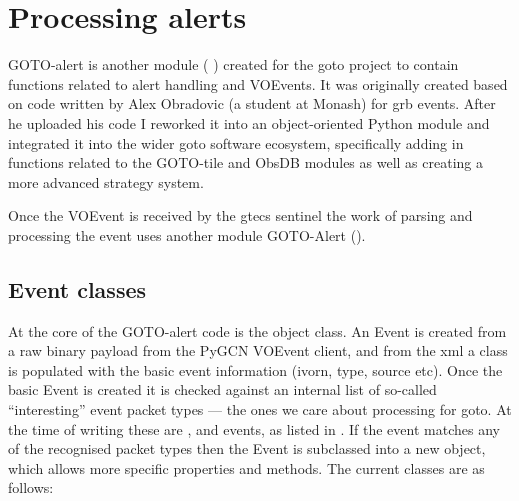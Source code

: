 \section{Processing alerts}
\label{sec:gotoalert}
\begin{colsection}


\begin{colsection}


GOTO-alert is another  module ( ) created for the \gls{goto} project to contain functions related to alert handling and VOEvents. It was originally created based on code written by Alex Obradovic (a student at Monash) for \gls{grb} events. After he uploaded his code I reworked it into an object-oriented Python module and integrated it into the wider \gls{goto} software ecosystem, specifically adding in functions related to the GOTO-tile and ObsDB modules as well as creating a more advanced strategy system.

Once the VOEvent is received by the \gls{gtecs} sentinel the work of parsing and processing the event uses another  module GOTO-Alert ().

\end{colsection}


\subsection{Event classes}
\label{sec:event_classes}
\begin{colsection}

At the core of the GOTO-alert code is the  object class. An Event is created from a raw binary payload from the PyGCN VOEvent client, and from the \gls{xml} a  class is populated with the basic event information (\gls{ivorn}, type, source etc). Once the basic Event is created it is checked against an internal list of so-called ``interesting'' event packet types --- the ones we care about processing for \gls{goto}. At the time of writing these are ,  and  events, as listed in . If the event matches any of the recognised packet types then the Event is subclassed into a new object, which allows more specific properties and methods. The current classes are as follows:


\end{colsection}
\end{colsection}
